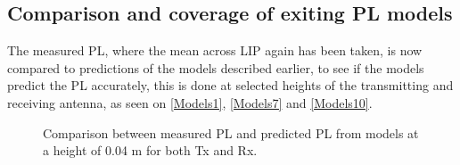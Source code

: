 

%
%
%
%
%


\subsection{Comparison and coverage of exiting PL models}

The measured PL, where the mean across LIP again has been taken, is now compared to predictions of the models described earlier, to see if the models predict the PL accurately, this is done at selected heights of the transmitting and receiving antenna, as seen on \autoref{Models1}, \autoref{Models7} and \autoref{Models10}.

\begin{figure}[H]
\centering

\caption{Comparison between measured PL and predicted PL from models at a height of 0.04 m for both Tx and Rx.}
\label{Models1}
\end{figure}




